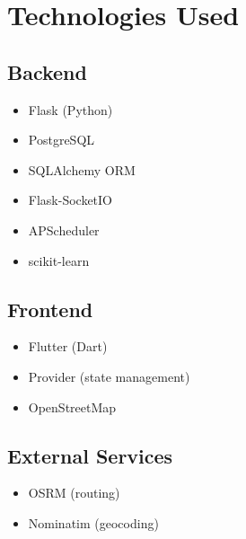 \section{Technologies Used}

\subsection{Backend}

\begin{itemize}
    \item Flask (Python)
    \item PostgreSQL
    \item SQLAlchemy ORM
    \item Flask-SocketIO
    \item APScheduler
    \item scikit-learn
\end{itemize}

\subsection{Frontend}

\begin{itemize}
    \item Flutter (Dart)
    \item Provider (state management)
    \item OpenStreetMap
\end{itemize}

\subsection{External Services}

\begin{itemize}
    \item OSRM (routing)
    \item Nominatim (geocoding)
\end{itemize}
